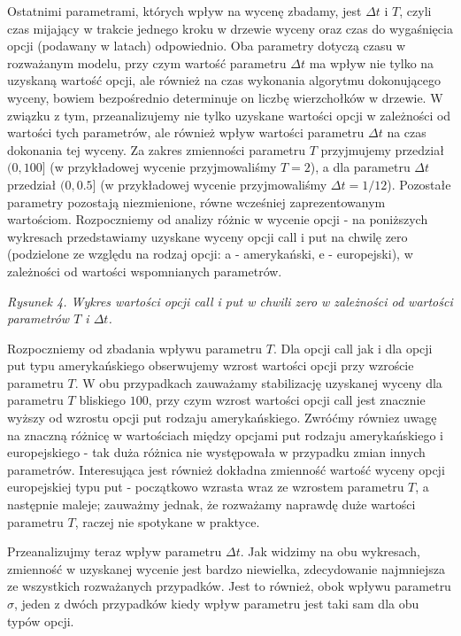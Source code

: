 \documentclass[
]{article}
\begin{document}
Ostatnimi parametrami, których wpływ na wycenę zbadamy, jest
\(\Delta t\) i \(T\), czyli czas mijający w trakcie jednego kroku w
drzewie wyceny oraz czas do wygaśnięcia opcji (podawany w latach)
odpowiednio. Oba parametry dotyczą czasu w rozważanym modelu, przy czym
wartość parametru \(\Delta t\) ma wpływ nie tylko na uzyskaną wartość
opcji, ale również na czas wykonania algorytmu dokonującego wyceny,
bowiem bezpośrednio determinuje on liczbę wierzchołków w drzewie. W
związku z tym, przeanalizujemy nie tylko uzyskane wartości opcji w
zależności od wartości tych parametrów, ale również wpływ wartości
parametru \(\Delta t\) na czas dokonania tej wyceny. Za zakres
zmienności parametru \(T\) przyjmujemy przedział \((0, 100]\) (w
przykładowej wycenie przyjmowaliśmy \(T = 2\)), a dla parametru
\(\Delta t\) przedział \((0, 0.5]\) (w przykładowej wycenie
przyjmowaliśmy \(\Delta t = 1/12\)). Pozostałe parametry pozostają
niezmienione, równe wcześniej zaprezentowanym wartościom. Rozpoczniemy
od analizy różnic w wycenie opcji - na poniższych wykresach
przedstawiamy uzyskane wyceny opcji call i put na chwilę zero
(podzielone ze względu na rodzaj opcji: a - amerykański, e -
europejski), w zależności od wartości wspomnianych parametrów.

\emph{Rysunek 4. Wykres wartości opcji call i put w chwili zero w
zależności od wartości parametrów \(T\) i \(\Delta t\).}

Rozpoczniemy od zbadania wpływu parametru \(T\). Dla opcji call jak i
dla opcji put typu amerykańskiego obserwujemy wzrost wartości opcji przy
wzroście parametru \(T\). W obu przypadkach zauważamy stabilizację
uzyskanej wyceny dla parametru \(T\) bliskiego \(100\), przy czym wzrost
wartości opcji call jest znacznie wyższy od wzrostu opcji put rodzaju
amerykańskiego. Zwróćmy równiez uwagę na znaczną różnicę w wartościach
między opcjami put rodzaju amerykańskiego i europejskiego - tak duża
różnica nie występowała w przypadku zmian innych parametrów.
Interesująca jest również dokładna zmienność wartość wyceny opcji
europejskiej typu put - początkowo wzrasta wraz ze wzrostem parametru
\(T\), a następnie maleje; zauważmy jednak, że rozważamy naprawdę duże
wartości parametru \(T\), raczej nie spotykane w praktyce.

Przeanalizujmy teraz wpływ parametru \(\Delta t\). Jak widzimy na obu
wykresach, zmienność w uzyskanej wycenie jest bardzo niewielka,
zdecydowanie najmniejsza ze wszystkich rozważanych przypadków. Jest to
również, obok wpływu parametru \(\sigma\), jeden z dwóch przypadków
kiedy wpływ parametru jest taki sam dla obu typów opcji.
\end{document}

